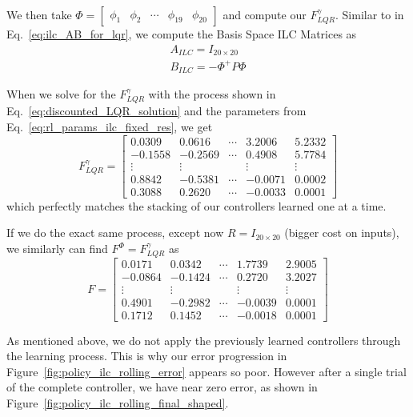 We then take $\Phi = \begin{bmatrix}\phi_1 & \phi_2 & \cdots & \phi_{19} & \phi_{20}\end{bmatrix}$ and compute our $F_{LQR}^\gamma$. Similar to in Eq.~\ref{eq:ilc_AB_for_lqr}, we compute the Basis Space ILC Matrices as
\begin{equation}
    \begin{split}
        A_{ILC} = I_{20 \times 20} \\
        B_{ILC} = -\Phi^+ P \Phi
    \end{split}
\end{equation}

When we solve for the $F_{LQR}^\gamma$ with the process shown in Eq.~\ref{eq:discounted_LQR_solution} and the parameters from Eq.~\ref{eq:rl_params_ilc_fixed_res}, we get
\begin{equation}
    F_{LQR}^\gamma
    = 
    \begin{bmatrix}
        0.0309  &  0.0616 & \cdots & 3.2006  &  5.2332 \\
        -0.1558 &  -0.2569 & \cdots & 0.4908  &  5.7784 \\
        \vdots & \vdots & & \vdots & \vdots \\
        0.8842 &  -0.5381& \cdots & -0.0071  &  0.0002 \\
        0.3088&    0.2620& \cdots & -0.0033  &  0.0001 
    \end{bmatrix}
\end{equation}
which perfectly matches the stacking of our controllers learned one at a time.

If we do the exact same process, except now $R = I_{20 \times 20}$ (bigger cost on inputs), we similarly can find $F^\Phi = F_{LQR}^\gamma$ as
\begin{equation}
    F
    = 
    \begin{bmatrix}
        0.0171  &  0.0342 & \cdots &   1.7739 &   2.9005\\
        -0.0864  & -0.1424  & \cdots &  0.2720 &   3.2027\\
        \vdots & \vdots & & \vdots & \vdots \\
        0.4901 &  -0.2982  & \cdots & -0.0039 &   0.0001\\
        0.1712  &  0.1452  & \cdots & -0.0018  &  0.0001
    \end{bmatrix}
\end{equation}

As mentioned above, we do not apply the previously learned controllers through the learning process. This is why our error progression in Figure~\ref{fig:policy_ilc_rolling_error} appears so poor. However after a single trial of the complete controller, we have near zero error, as shown in Figure~\ref{fig:policy_ilc_rolling_final_shaped}.

